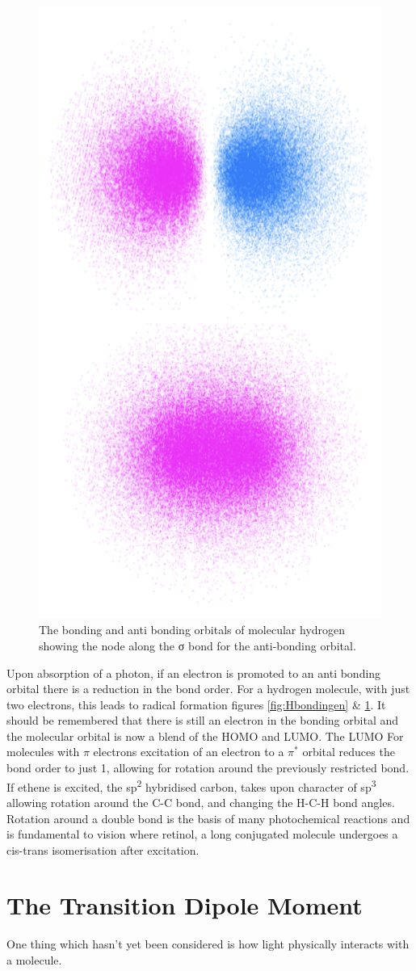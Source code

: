 \documentclass[
]{book}
\begin{document}
\begin{figure}

{\centering \includegraphics[width=0.3\linewidth]{images/Hbondingorb} 

}

\caption{The bonding and anti bonding orbitals of molecular hydrogen showing the node along the σ bond for the anti-bonding orbital.}\label{fig:Hbondingorb}
\end{figure}

Upon absorption of a photon, if an electron is promoted to an anti bonding orbital there is a reduction in the bond order. For a hydrogen molecule, with just two electrons, this leads to radical formation figures \ref{fig:Hbondingen} \& \ref{fig:Hbondingorb}.
It should be remembered that there is still an electron in the bonding orbital and the molecular orbital is now a blend of the HOMO and LUMO. The LUMO
For molecules with \(\pi\) electrons excitation of an electron to a \(\pi ^\ast\) orbital reduces the bond order to just 1, allowing for rotation around the previously restricted bond. If ethene is excited, the sp\textsuperscript{2} hybridised carbon, takes upon character of sp\textsuperscript{3} allowing rotation around the C-C bond, and changing the H-C-H bond angles. Rotation around a double bond is the basis of many photochemical reactions and is fundamental to vision where retinol, a long conjugated molecule undergoes a cis-trans isomerisation after excitation.

\hypertarget{sec:transdipole}{%
\section{The Transition Dipole Moment}\label{sec:transdipole}}

One thing which hasn't yet been considered is how light physically interacts with a molecule.
\end{document}
